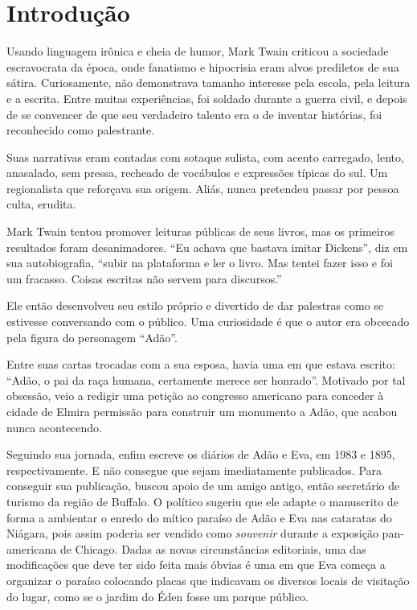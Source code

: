 \documentclass[12pt]{extarticle}
\begin{document}
\tableofcontents

\section{Introdução}

Usando linguagem irônica e cheia de humor, Mark Twain 
criticou a sociedade escravocrata da época, 
onde fanatismo e hipocrisia eram alvos prediletos de sua sátira.
Curiosamente, não demonstrava tamanho interesse pela escola, pela leitura e a escrita.
Entre muitas experiências, foi soldado durante a guerra civil, 
e depois de se convencer de que seu verdadeiro talento era 
o de inventar histórias, foi reconhecido como palestrante.

Suas narrativas eram contadas com sotaque sulista, 
com acento carregado, lento, anasalado, sem pressa, 
recheado de vocábulos e expressões típicas do sul.
Um regionalista que reforçava sua origem.
Aliás, nunca pretendeu passar por pessoa culta, erudita.

Mark Twain tentou promover leituras públicas de seus livros, 
mas os primeiros resultados foram desanimadores. 
“Eu achava que bastava imitar Dickens”, diz em sua autobiografia, 
“subir na plataforma e ler o livro. Mas tentei fazer isso e foi um fracasso. 
Coisas escritas não servem para discursos.” 

Ele então desenvolveu seu estilo próprio e 
divertido de dar palestras como se estivesse conversando com o público.
Uma curiosidade é que o autor era obcecado pela figura do personagem ``Adão''.

Entre suas cartas trocadas com a sua esposa, 
havia uma em que estava escrito: “Adão, o pai da raça humana, certamente 
merece ser honrado”.
Motivado por tal obsessão, veio a redigir uma petição ao congresso americano 
para conceder à cidade de Elmira permissão para 
construir um monumento a Adão, que acabou nunca acontecendo.

Seguindo sua jornada, enfim escreve os diários de Adão e Eva, 
em 1983 e 1895, respectivamente. E não consegue que sejam imediatamente publicados.
Para conseguir sua publicação, buscou apoio de um amigo antigo, 
então secretário de turismo da região de Buffalo.
O político sugeriu que ele adapte o manuscrito de forma a 
ambientar o enredo do mítico paraíso de Adão e Eva nas cataratas do Niágara, 
pois assim poderia ser vendido como \textit{souvenir} durante a exposição 
pan-americana de Chicago.
Dadas as novas circunstâncias editoriais, uma das modificações que 
deve ter sido feita mais óbvias é uma em que Eva começa a organizar 
o paraíso colocando placas que indicavam os diversos locais de visitação 
do lugar, como se o jardim do Éden fosse um parque público.
\end{document}

